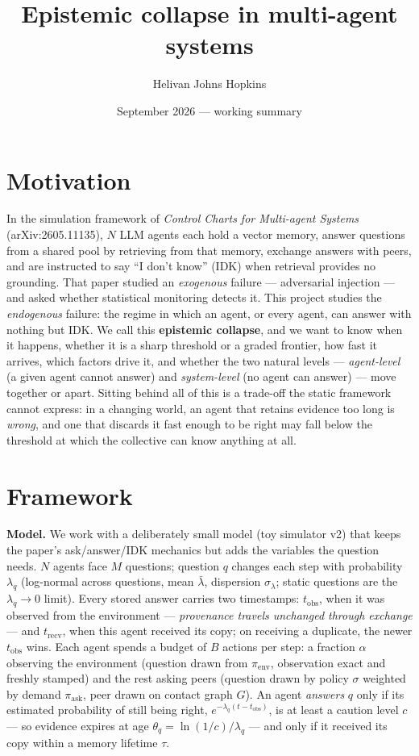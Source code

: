 \documentclass[10pt,twocolumn]{article}
\title{\vspace{-1.2em}\textbf{Epistemic collapse in multi-agent systems}}
\author{Helivan \quad Johns Hopkins}
\date{September 2026 --- working summary}
\begin{document}
\maketitle

\section*{Motivation}
In the simulation framework of \emph{Control Charts for Multi-agent
Systems} (arXiv:2605.11135), $N$ LLM agents each hold a vector memory,
answer questions from a shared pool by retrieving from that memory,
exchange answers with peers, and are instructed to say ``I don't know''
(IDK) when retrieval provides no grounding. That paper studied an
\emph{exogenous} failure --- adversarial injection --- and asked whether
statistical monitoring detects it. This project studies the
\emph{endogenous} failure: the regime in which an agent, or every agent,
can answer with nothing but IDK. We call this \textbf{epistemic
collapse}, and we want to know when it happens, whether it is a sharp
threshold or a graded frontier, how fast it arrives, which factors drive
it, and whether the two natural levels --- \emph{agent-level} (a given
agent cannot answer) and \emph{system-level} (no agent can answer) ---
move together or apart. Sitting behind all of this is a trade-off the
static framework cannot express: in a changing world, an agent that
retains evidence too long is \emph{wrong}, and one that discards it fast
enough to be right may fall below the threshold at which the collective
can know anything at all.

\section*{Framework}
\textbf{Model.} We work with a deliberately small model (toy simulator
v2) that keeps the paper's ask/answer/IDK mechanics but adds the
variables the question needs. $N$ agents face $M$ questions; question $q$
changes each step with probability $\lambda_q$ (log-normal across
questions, mean $\bar\lambda$, dispersion $\sigma_\lambda$; static
questions are the $\lambda_q\to0$ limit). Every stored answer carries two
timestamps: $t_{\mathrm{obs}}$, when it was observed from the
environment --- \emph{provenance travels unchanged through exchange} ---
and $t_{\mathrm{recv}}$, when this agent received its copy; on receiving
a duplicate, the newer $t_{\mathrm{obs}}$ wins. Each agent spends a
budget of $B$ actions per step: a fraction $\alpha$ observing the
environment (question drawn from $\pi_{\mathrm{env}}$, observation exact
and freshly stamped) and the rest asking peers (question drawn by policy
$\sigma$ weighted by demand $\pi_{\mathrm{ask}}$, peer drawn on contact
graph $G$). An agent \emph{answers} $q$ only if its estimated probability
of still being right, $e^{-\lambda_q(t - t_{\mathrm{obs}})}$, is at least
a caution level $c$ --- so evidence expires at age
$\theta_q = \ln(1/c)/\lambda_q$ --- and only if it received its copy
within a memory lifetime $\tau$.
\end{document}
